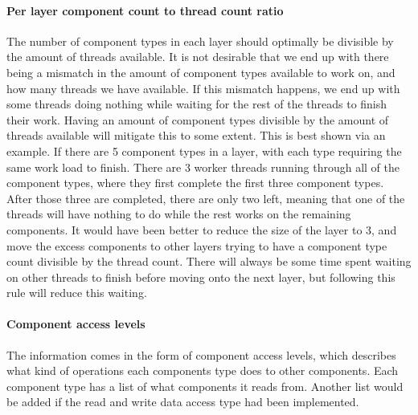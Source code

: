\paragraph{Per layer component count to thread count ratio}
The number of component types in each layer should optimally be divisible by the amount of threads available.
It is not desirable that we end up with there being a mismatch in the amount of component types available to work on, and how many threads we have available.
If this mismatch happens, we end up with some threads doing nothing while waiting for the rest of the threads to finish their work.
Having an amount of component types divisible by the amount of threads available will mitigate this to some extent.
This is best shown via an example.
If there are 5 component types in a layer, with each type requiring the same work load to finish.
There are 3 worker threads running through all of the component types, where they first complete the first three component types.
After those three are completed, there are only two left, meaning that one of the threads will have nothing to do while the rest works on the remaining components.
It would have been better to reduce the size of the layer to 3, and move the excess components to other layers trying to have a component type count divisible by the thread count.
There will always be some time spent waiting on other threads to finish before moving onto the next layer, but following this rule will reduce this waiting.

\paragraph{Component access levels}
The information comes in the form of component access levels, which describes what kind of operations each components type does to other components.
Each component type has a list of what components it reads from.
Another list would be added if the read and write data access type had been implemented.

